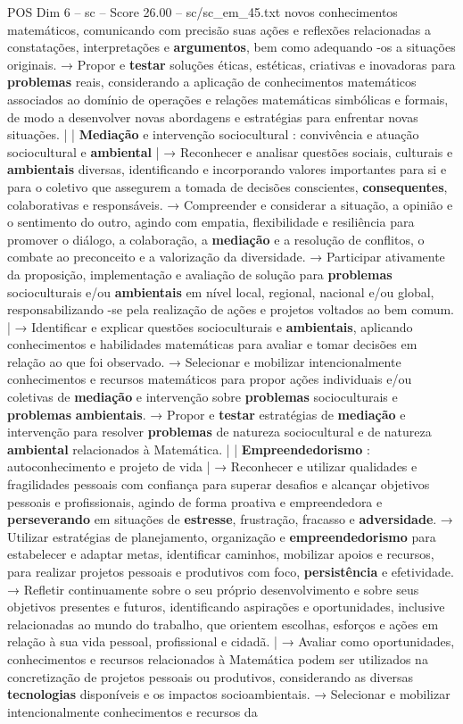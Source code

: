 \begin{textsample}{POS Dim 6 – sc – Score 26.00 – sc/sc\_em\_45.txt}
novos conhecimentos matemáticos, comunicando com precisão suas ações e reflexões relacionadas a constatações, interpretações e \textbf{argumentos}, bem como adequando -os a situações originais. → Propor e \textbf{testar} soluções éticas, estéticas, criativas e inovadoras para \textbf{problemas} reais, considerando a aplicação de conhecimentos matemáticos associados ao domínio de operações e relações matemáticas simbólicas e formais, de modo a desenvolver novas abordagens e estratégias para enfrentar novas situações. | | \textbf{Mediação} e intervenção sociocultural : convivência e atuação sociocultural e \textbf{ambiental} | → Reconhecer e analisar questões sociais, culturais e \textbf{ambientais} diversas, identificando e incorporando valores importantes para si e para o coletivo que assegurem a tomada de decisões conscientes, \textbf{consequentes}, colaborativas e responsáveis. → Compreender e considerar a situação, a opinião e o sentimento do outro, agindo com empatia, flexibilidade e resiliência para promover o diálogo, a colaboração, a \textbf{mediação} e a resolução de conflitos, o combate ao preconceito e a valorização da diversidade. → Participar ativamente da proposição, implementação e avaliação de solução para \textbf{problemas} socioculturais e/ou \textbf{ambientais} em nível local, regional, nacional e/ou global, responsabilizando -se pela realização de ações e projetos voltados ao bem comum. | → Identificar e explicar questões socioculturais e \textbf{ambientais}, aplicando conhecimentos e habilidades matemáticas para avaliar e tomar decisões em relação ao que foi observado. → Selecionar e mobilizar intencionalmente conhecimentos e recursos matemáticos para propor ações individuais e/ou coletivas de \textbf{mediação} e intervenção sobre \textbf{problemas} socioculturais e \textbf{problemas} \textbf{ambientais}. → Propor e \textbf{testar} estratégias de \textbf{mediação} e intervenção para resolver \textbf{problemas} de natureza sociocultural e de natureza \textbf{ambiental} relacionados à Matemática. | | \textbf{Empreendedorismo} : autoconhecimento e projeto de vida | → Reconhecer e utilizar qualidades e fragilidades pessoais com confiança para superar desafios e alcançar objetivos pessoais e profissionais, agindo de forma proativa e empreendedora e \textbf{perseverando} em situações de \textbf{estresse}, frustração, fracasso e \textbf{adversidade}. → Utilizar estratégias de planejamento, organização e \textbf{empreendedorismo} para estabelecer e adaptar metas, identificar caminhos, mobilizar apoios e recursos, para realizar projetos pessoais e produtivos com foco, \textbf{persistência} e efetividade. → Refletir continuamente sobre o seu próprio desenvolvimento e sobre seus objetivos presentes e futuros, identificando aspirações e oportunidades, inclusive relacionadas ao mundo do trabalho, que orientem escolhas, esforços e ações em relação à sua vida pessoal, profissional e cidadã. | → Avaliar como oportunidades, conhecimentos e recursos relacionados à Matemática podem ser utilizados na concretização de projetos pessoais ou produtivos, considerando as diversas \textbf{tecnologias} disponíveis e os impactos socioambientais. → Selecionar e mobilizar intencionalmente conhecimentos e recursos da 
\end{textsample}
